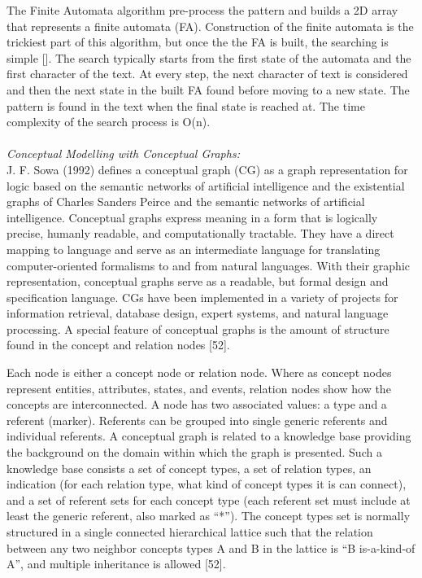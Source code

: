 \documentclass[a4paper]{article}
\begin{document}
The Finite Automata algorithm pre-process the pattern and builds a 2D array that represents a finite automata (FA). Construction of the finite automata is the trickiest part of this algorithm, but once the the FA is built, the searching is simple []. The search typically starts from the first state of the automata and the first character of the text. At every step, the next character of text is considered and then the next state in the built FA found before moving to a new state. The pattern is found in the text when the final state is reached at. The time complexity of the search process is O(n).\\ \\
\textit{Conceptual Modelling with Conceptual Graphs:} \\
J. F. Sowa (1992) defines a conceptual graph (CG) as a graph representation for logic based on the semantic networks of artificial intelligence and the existential graphs of Charles Sanders Peirce and the semantic networks of artificial intelligence. Conceptual graphs express meaning in a form that is logically precise, humanly readable, and computationally tractable. They have a direct mapping to language and serve as an intermediate language for translating computer-oriented formalisms to and from natural languages. With their graphic representation, conceptual graphs serve as a readable, but formal design and specification language. CGs have been implemented in a variety of projects for information retrieval, database design, expert systems, and natural language processing. A special feature of conceptual graphs is the amount of structure found in the concept and relation nodes [52].

Each node is either a concept node or relation node.  Where as concept nodes represent entities, attributes, states, and events, relation nodes show how the concepts are interconnected. A node has two associated values: a type and a referent (marker). Referents can be grouped into single generic referents and individual referents. A conceptual graph is related to a knowledge base providing the background on the domain within which the graph is presented. Such a knowledge base consists a set of concept types, a set of relation types, an indication (for each relation type, what kind of concept types it is can connect), and a set of referent sets for each concept type (each referent set must include at least the generic referent, also marked as “*”). The concept types set is normally structured in a single connected hierarchical lattice such that the relation between any two neighbor concepts types A and B in the lattice is “B is-a-kind-of A”, and multiple inheritance is allowed [52].
\end{document}
